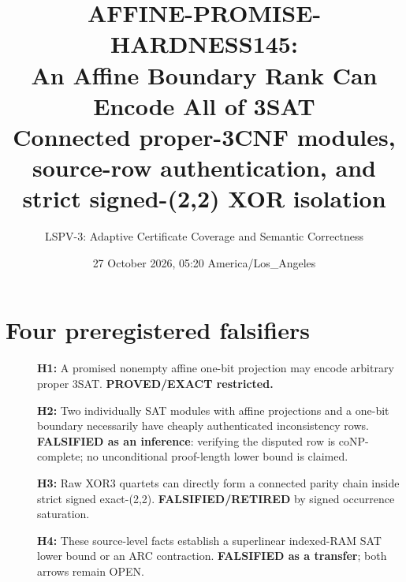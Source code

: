 \documentclass[11pt]{article}
\title{AFFINE-PROMISE-HARDNESS145:\\An Affine Boundary Rank Can Encode All of 3SAT\\
\large Connected proper-3CNF modules, source-row authentication, and strict signed-(2,2) XOR isolation}
\author{LSPV-3: Adaptive Certificate Coverage and Semantic Correctness}
\date{27 October 2026, 05:20 America/Los\_Angeles}
\begin{document}
\maketitle
\begin{center}
\end{center}

\section{Four preregistered falsifiers}
\begin{description}
\item[] \textbf{H1:} A promised nonempty affine one-bit projection
may encode arbitrary proper 3SAT. \textbf{PROVED/EXACT restricted.}
\item[] \textbf{H2:} Two individually SAT modules with affine
projections and a one-bit boundary necessarily have cheaply
authenticated inconsistency rows. \textbf{FALSIFIED as an inference}:
verifying the disputed row is coNP-complete; no unconditional
proof-length lower bound is claimed.
\item[] \textbf{H3:} Raw XOR3 quartets can directly form a
connected parity chain inside strict signed exact-(2,2).
\textbf{FALSIFIED/RETIRED} by signed occurrence saturation.
\item[] \textbf{H4:} These source-level facts establish a
superlinear indexed-RAM SAT lower bound or an ARC contraction.
\textbf{FALSIFIED as a transfer}; both arrows remain OPEN.
\end{description}
\end{document}
